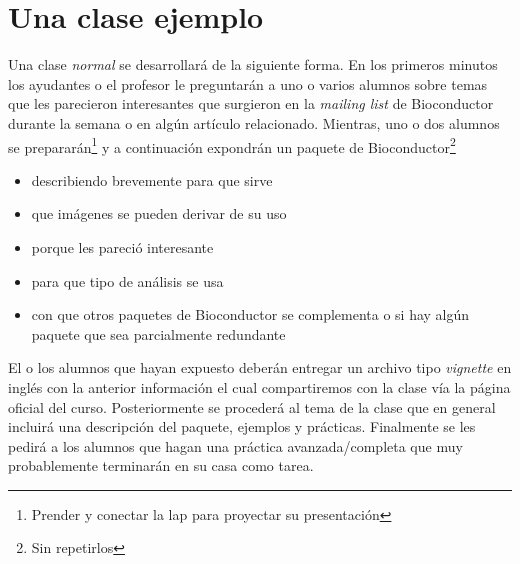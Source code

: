 \documentclass[letterpaper,12pt]{article}
\begin{document}
\section{Una clase ejemplo}
Una clase \emph{normal} se desarrollará de la siguiente forma. En los primeros minutos los ayudantes o el profesor le preguntarán a uno o varios alumnos sobre temas que les parecieron interesantes que surgieron en la \emph{mailing list} de Bioconductor durante la semana o en algún artículo relacionado. Mientras, uno o dos alumnos se prepararán\footnote{Prender y conectar la lap para proyectar su presentación} y a continuación expondrán un paquete de Bioconductor\footnote{Sin repetirlos}
  \begin{itemize}
  \item describiendo brevemente para que sirve
  \item que imágenes se pueden derivar de su uso
  \item porque les pareció interesante
  \item para que tipo de análisis se usa
  \item con que otros paquetes de Bioconductor se complementa o si hay algún paquete que sea parcialmente redundante
  \end{itemize}
El o los alumnos que hayan expuesto deberán entregar un archivo tipo \emph{vignette} en inglés con la anterior información el cual compartiremos con la clase vía la página oficial del curso. Posteriormente se procederá al tema de la clase que en general incluirá una descripción del paquete, ejemplos y prácticas. Finalmente se les pedirá a los alumnos que hagan una práctica avanzada/completa que muy probablemente terminarán en su casa como tarea.
\end{document}
